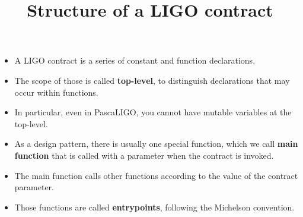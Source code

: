\documentclass[wide]{slides}
\begin{document}
\begin{slide}
  \title{Structure of a LIGO contract}

  \begin{itemize}

    \item A LIGO contract is a series of constant and function
      declarations.

    \item The scope of those is called \textbf{top-level}, to
      distinguish declarations that may occur within functions.

    \item In particular, even in PascaLIGO, you cannot have mutable
      variables at the top-level.

    \item As a design pattern, there is usually one special function,
      which we call \textbf{main function} that is called with a
      parameter when the contract is invoked.

    \item The main function calls other functions according to the
      value of the contract parameter.

    \item Those functions are called \textbf{entrypoints}, following
      the Michelson convention.

  \end{itemize}

\end{slide}
\end{document}
